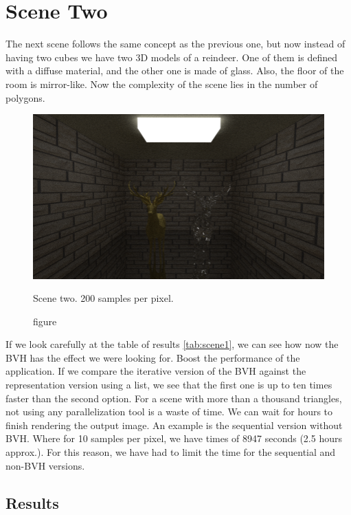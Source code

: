 \documentclass[titlepage,12pt]{report}
\begin{document}
\section{Scene Two}

The next scene follows the same concept as the previous one, but now instead of having two cubes we have two 3D models of a reindeer. One of them is defined with a diffuse material, and the other one is made of glass. Also, the floor of the room is mirror-like. Now the complexity of the scene lies in the number of polygons.

\begin{figure}[H]
	\centering
	\includegraphics[scale=0.50]{media/cornell_deer_textures.png}
	\caption{figure}{Scene two. 200 samples per pixel.}
	\label{sc2}
\end{figure}

If we look carefully at the table of results \ref{tab:scene1}, we can see how now the BVH has the effect we were looking for. Boost the performance of the application. If we compare the iterative version of the BVH against the representation version using a list, we see that the first one is up to ten times faster than the second option. For a scene with more than a thousand triangles, not using any parallelization tool is a waste of time. We can wait for hours to finish rendering the output image. An example is the sequential version without BVH. Where for 10 samples per pixel, we have times of 8947 seconds (2.5 hours approx.). For this reason, we have had to limit the time for the sequential and non-BVH versions.

\subsection{Results}
\end{document}
